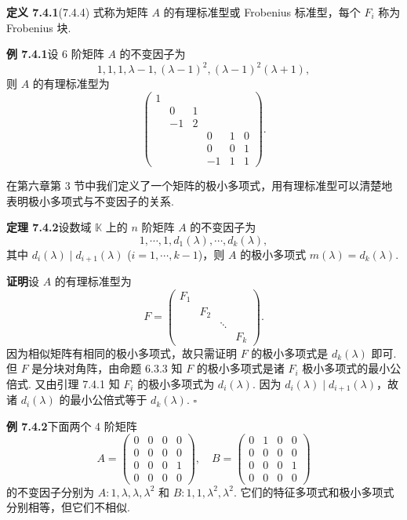 \documentclass[UTF8, 12pt, fontset=fandol, oneside]{ctexart}
\begin{document}
\noindent\textbf{定义 7.4.1}\quad (7.4.4) 式称为矩阵 $A$ 的有理标准型或 Frobenius 标准型，每个 $F_i$ 称为 Frobenius 块.

\noindent\textbf{例 7.4.1}\quad 设 6 阶矩阵 $A$ 的不变因子为
\[
1,1,1,\lambda-1,(\lambda-1)^2,(\lambda-1)^2(\lambda+1),
\]
则 $A$ 的有理标准型为
\[
\left(\begin{array}{cccccc}
1 & & & & & \\
& 0 & 1 & & & \\
& -1 & 2 & & & \\
& & & 0 & 1 & 0\\
& & & 0 & 0 & 1\\
& & & -1 & 1 & 1
\end{array}\right).
\]

在第六章第 3 节中我们定义了一个矩阵的极小多项式，用有理标准型可以清楚地表明极小多项式与不变因子的关系.

\noindent\textbf{定理 7.4.2}\quad 设数域 $\mathbb{K}$ 上的 $n$ 阶矩阵 $A$ 的不变因子为
\[
1,\cdots,1,d_1(\lambda),\cdots,d_k(\lambda),
\]
其中 $d_i(\lambda)\mid d_{i+1}(\lambda)$ ($i=1,\cdots,k-1$)，则 $A$ 的极小多项式 $m(\lambda)=d_k(\lambda)$.

\noindent\textbf{证明}\quad 设 $A$ 的有理标准型为
\[
F=\left(\begin{array}{cccc}
F_1 & & & \\
& F_2 & & \\
& & \ddots & \\
& & & F_k
\end{array}\right).
\]
因为相似矩阵有相同的极小多项式，故只需证明 $F$ 的极小多项式是 $d_k(\lambda)$ 即可. 但 $F$ 是分块对角阵，由命题 6.3.3 知 $F$ 的极小多项式是诸 $F_i$ 极小多项式的最小公倍式. 又由引理 7.4.1 知 $F_i$ 的极小多项式为 $d_i(\lambda)$. 因为 $d_i(\lambda)\mid d_{i+1}(\lambda)$，故诸 $d_i(\lambda)$ 的最小公倍式等于 $d_k(\lambda)$. $\square$

\noindent\textbf{例 7.4.2}\quad 下面两个 4 阶矩阵
\[
A=\left(\begin{array}{cccc}
0 & 0 & 0 & 0\\
0 & 0 & 0 & 0\\
0 & 0 & 0 & 1\\
0 & 0 & 0 & 0
\end{array}\right),\quad
B=\left(\begin{array}{cccc}
0 & 1 & 0 & 0\\
0 & 0 & 0 & 0\\
0 & 0 & 0 & 1\\
0 & 0 & 0 & 0
\end{array}\right)
\]
的不变因子分别为 $A:1,\lambda,\lambda,\lambda^2$ 和 $B:1,1,\lambda^2,\lambda^2$. 它们的特征多项式和极小多项式分别相等，但它们不相似.
\end{document}
